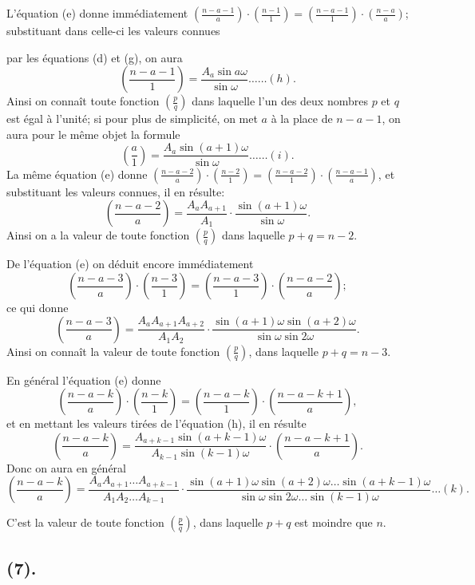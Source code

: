 \documentclass{article}
\begin{document}
L'équation (e) donne immédiatement $\left(\frac{n-a-1}{a}\right)\cdot\left(\frac{n-1}{1}\right)=\left(\frac{n-a-1}{1}\right)\cdot\left(\frac{n-a}{a}\right)$; substituant dans celle-ci les valeurs connues

par les équations (d) et (g), on aura
\[ \left(\frac{n-a-1}{1}\right)=\frac{A_{a}\sin a\omega}{\sin\omega}\ldots\ldots(h). \]
Ainsi on connaît toute fonction $\left(\frac{p}{q}\right)$ dans laquelle l'un des deux nombres $p$ et $q$ est égal à l'unité; si pour plus de simplicité, on met $a$ à la place de $n-a-1$, on aura pour le même objet la formule
\[ \left(\frac{a}{1}\right)=\frac{A_{a}\sin(a+1)\omega}{\sin\omega}\ldots\ldots(i). \]
La même équation (e) donne $\left(\frac{n-a-2}{a}\right)\cdot\left(\frac{n-2}{1}\right)=\left(\frac{n-a-2}{1}\right)\cdot\left(\frac{n-a-1}{a}\right)$, et substituant les valeurs connues, il en résulte:
\[ \left(\frac{n-a-2}{a}\right)=\frac{A_{a}A_{a+1}}{A_{1}}\cdot\frac{\sin(a+1)\omega}{\sin\omega}. \]
Ainsi on a la valeur de toute fonction $\left(\frac{p}{q}\right)$ dans laquelle $p+q=n-2$.

De l'équation (e) on déduit encore immédiatement
\[ \left(\frac{n-a-3}{a}\right)\cdot\left(\frac{n-3}{1}\right)=\left(\frac{n-a-3}{1}\right)\cdot\left(\frac{n-a-2}{a}\right); \]
ce qui donne
\[ \left(\frac{n-a-3}{a}\right)=\frac{A_{a}A_{a+1}A_{a+2}}{A_{1}A_{2}}\cdot\frac{\sin(a+1)\omega\sin(a+2)\omega}{\sin\omega\sin 2\omega}. \]
Ainsi on connaît la valeur de toute fonction $\left(\frac{p}{q}\right)$, dans laquelle $p+q=n-3$.

En général l'équation (e) donne
\[ \left(\frac{n-a-k}{a}\right)\cdot\left(\frac{n-k}{1}\right)=\left(\frac{n-a-k}{1}\right)\cdot\left(\frac{n-a-k+1}{a}\right), \]
et en mettant les valeurs tirées de l'équation (h), il en résulte
\[ \left(\frac{n-a-k}{a}\right)=\frac{A_{a+k-1}\sin(a+k-1)\omega}{A_{k-1}\sin(k-1)\omega}\cdot\left(\frac{n-a-k+1}{a}\right). \]
Donc on aura en général
\[ \left(\frac{n-a-k}{a}\right)=\frac{A_{a}A_{a+1}\ldots A_{a+k-1}}{A_{1}A_{2}\ldots A_{k-1}}\cdot\frac{\sin(a+1)\omega\sin(a+2)\omega\ldots\sin(a+k-1)\omega}{\sin\omega\sin 2\omega\ldots\sin(k-1)\omega}\ldots(k). \]

C'est la valeur de toute fonction $\left(\frac{p}{q}\right)$, dans laquelle $p+q$ est moindre que $n$.

\subsection*{(7).}
\end{document}

